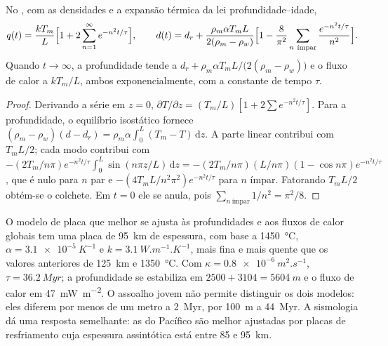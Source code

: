 \begin{proposition}\label{prop:b3:lithosphere-thermal-models:plate-depth}
No , com as densidades e a expansão térmica
da lei profundidade--idade,
\[
  q(t) = \frac{kT_m}{L}\Bigl[1 + 2\sum_{n=1}^\infty e^{-n^2t/\tau}\Bigr],\qquad
  d(t) = d_r + \frac{\rho_m\alpha T_mL}{2(\rho_m - \rho_w)}
  \Bigl[1 - \frac{8}{\pi^2}\sum_{n\ \text{ímpar}}\frac{e^{-n^2t/\tau}}{n^2}\Bigr].
\]
Quando $t \to \infty$, a profundidade tende a $d_r + \rho_m\alpha T_mL/\bigl(2(\rho_m -
\rho_w)\bigr)$ e o fluxo de calor a $kT_m/L$, ambos exponencialmente, com a
constante de tempo $\tau$.
\end{proposition}

\begin{proof}
Derivando a série em $z = 0$, $\partial T/\partial z = (T_m/L)[1 +
2\sum e^{-n^2t/\tau}]$. Para a profundidade, o equilíbrio isostático fornece $(\rho_m -
\rho_w)(d - d_r) = \rho_m\alpha\int_0^L(T_m - T)\,\mathrm dz$. A parte linear
contribui com $T_mL/2$; cada modo contribui com $-(2T_m/n\pi)e^{-n^2t/\tau}
\int_0^L\sin(n\pi z/L)\,\mathrm dz = -(2T_m/n\pi)(L/n\pi)(1 - \cos n\pi)
e^{-n^2t/\tau}$, que é nulo para $n$ par e $-(4T_mL/n^2\pi^2)
e^{-n^2t/\tau}$ para $n$ ímpar. Fatorando $T_mL/2$ obtém-se o colchete. Em $t = 0$
ele se anula, pois $\sum_{n\ \text{ímpar}}1/n^2 = \pi^2/8$.
\end{proof}

O modelo de placa que melhor se ajusta às profundidades e aos fluxos de calor globais tem uma placa
de \qty{95}{km} de espessura, com base a \qty{1450}{\celsius}, $\alpha =
\qty{3.1e-5}{K^{-1}}$ e $k = \qty{3.1}{W.m^{-1}.K^{-1}}$, mais fina e mais quente
que os valores anteriores de \qty{125}{km} e \qty{1350}{\celsius}. Com $\kappa =
\qty{0.8e-6}{m^2.s^{-1}}$, $\tau = \qty{36.2}{Myr}$; a profundidade se estabiliza em
$2500 + 3104 = \qty{5604}{m}$ e o fluxo de calor em \qty{47}{mW.m^{-2}}. O assoalho
jovem não permite distinguir os dois modelos: eles diferem por menos de um metro a
\qty{2}{Myr}, por \qty{100}{m} a \qty{44}{Myr}. A sismologia dá uma resposta
semelhante: as  do Pacífico são melhor ajustadas por placas de
resfriamento cuja espessura assintótica está entre 85 e \qty{95}{km}.

